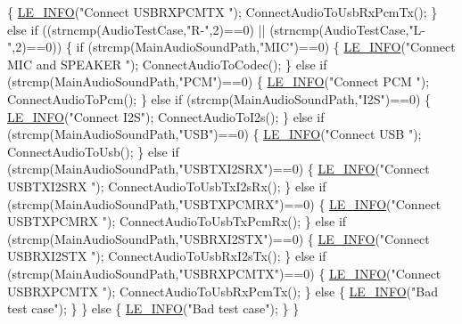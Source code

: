 \begin{DoxyCodeInclude}
{{{{{{{{{{{    \{
        \hyperlink{le__log_8h_a23e6d206faa64f612045d688cdde5808}{LE\_INFO}(\textcolor{stringliteral}{"Connect USBRXPCMTX "});
        ConnectAudioToUsbRxPcmTx();
    \}
    \textcolor{keywordflow}{else} \textcolor{keywordflow}{if} ((strncmp(AudioTestCase,\textcolor{stringliteral}{"R-"},2)==0) || (strncmp(AudioTestCase,\textcolor{stringliteral}{"L-"},2)==0))
    \{
        \textcolor{keywordflow}{if} (strcmp(MainAudioSoundPath,\textcolor{stringliteral}{"MIC"})==0)
        \{
            \hyperlink{le__log_8h_a23e6d206faa64f612045d688cdde5808}{LE\_INFO}(\textcolor{stringliteral}{"Connect MIC and SPEAKER "});
            ConnectAudioToCodec();
        \}
        \textcolor{keywordflow}{else} \textcolor{keywordflow}{if} (strcmp(MainAudioSoundPath,\textcolor{stringliteral}{"PCM"})==0)
        \{
            \hyperlink{le__log_8h_a23e6d206faa64f612045d688cdde5808}{LE\_INFO}(\textcolor{stringliteral}{"Connect PCM "});
            ConnectAudioToPcm();
        \}
        \textcolor{keywordflow}{else} \textcolor{keywordflow}{if} (strcmp(MainAudioSoundPath,\textcolor{stringliteral}{"I2S"})==0)
        \{
            \hyperlink{le__log_8h_a23e6d206faa64f612045d688cdde5808}{LE\_INFO}(\textcolor{stringliteral}{"Connect I2S"});
            ConnectAudioToI2s();
        \}
        \textcolor{keywordflow}{else} \textcolor{keywordflow}{if} (strcmp(MainAudioSoundPath,\textcolor{stringliteral}{"USB"})==0)
        \{
            \hyperlink{le__log_8h_a23e6d206faa64f612045d688cdde5808}{LE\_INFO}(\textcolor{stringliteral}{"Connect USB "});
            ConnectAudioToUsb();
        \}
        \textcolor{keywordflow}{else} \textcolor{keywordflow}{if} (strcmp(MainAudioSoundPath,\textcolor{stringliteral}{"USBTXI2SRX"})==0)
        \{
            \hyperlink{le__log_8h_a23e6d206faa64f612045d688cdde5808}{LE\_INFO}(\textcolor{stringliteral}{"Connect USBTXI2SRX "});
            ConnectAudioToUsbTxI2sRx();
        \}
        \textcolor{keywordflow}{else} \textcolor{keywordflow}{if} (strcmp(MainAudioSoundPath,\textcolor{stringliteral}{"USBTXPCMRX"})==0)
        \{
            \hyperlink{le__log_8h_a23e6d206faa64f612045d688cdde5808}{LE\_INFO}(\textcolor{stringliteral}{"Connect USBTXPCMRX "});
            ConnectAudioToUsbTxPcmRx();
        \}
        \textcolor{keywordflow}{else} \textcolor{keywordflow}{if} (strcmp(MainAudioSoundPath,\textcolor{stringliteral}{"USBRXI2STX"})==0)
        \{
            \hyperlink{le__log_8h_a23e6d206faa64f612045d688cdde5808}{LE\_INFO}(\textcolor{stringliteral}{"Connect USBRXI2STX "});
            ConnectAudioToUsbRxI2sTx();
        \}
        \textcolor{keywordflow}{else} \textcolor{keywordflow}{if} (strcmp(MainAudioSoundPath,\textcolor{stringliteral}{"USBRXPCMTX"})==0)
        \{
            \hyperlink{le__log_8h_a23e6d206faa64f612045d688cdde5808}{LE\_INFO}(\textcolor{stringliteral}{"Connect USBRXPCMTX "});
            ConnectAudioToUsbRxPcmTx();
        \}
        \textcolor{keywordflow}{else}
        \{
            \hyperlink{le__log_8h_a23e6d206faa64f612045d688cdde5808}{LE\_INFO}(\textcolor{stringliteral}{"Bad test case"});
        \}
    \}
    \textcolor{keywordflow}{else}
    \{
        \hyperlink{le__log_8h_a23e6d206faa64f612045d688cdde5808}{LE\_INFO}(\textcolor{stringliteral}{"Bad test case"});
    \}
\}

}}}}}}}}}}}
\end{DoxyCodeInclude}
